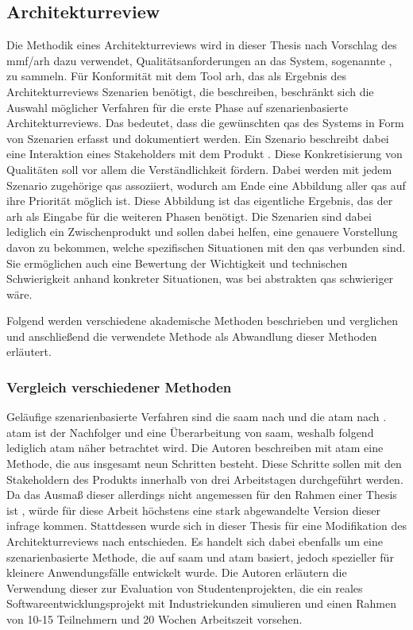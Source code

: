 \subsection{Architekturreview}
\label{sec:methodik-architekturreview}

Die Methodik eines Architekturreviews wird in dieser Thesis nach Vorschlag des \gls{mmf}/\gls{arh} dazu verwendet, Qualitätsanforderungen an das System, sogenannte , zu sammeln.
Für Konformität mit dem Tool \gls{arh}, das als Ergebnis des Architekturreviews Szenarien benötigt, die  beschreiben, beschränkt sich die Auswahl möglicher Verfahren für die erste Phase auf szenarienbasierte Architekturreviews.
Das bedeutet, dass die gewünschten \glspl{qa} des Systems in Form von Szenarien erfasst und dokumentiert werden.
Ein Szenario beschreibt dabei eine Interaktion eines Stakeholders mit dem Produkt \cite{kazman_2000}.
Diese Konkretisierung von Qualitäten soll vor allem die Verständlichkeit fördern.
Dabei werden mit jedem Szenario zugehörige \glspl{qa} assoziiert, wodurch am Ende eine Abbildung aller \glspl{qa} auf ihre Priorität möglich ist.
Diese Abbildung ist das eigentliche Ergebnis, das der \gls{arh} als Eingabe für die weiteren Phasen benötigt.
Die Szenarien sind dabei lediglich ein Zwischenprodukt und sollen dabei helfen, eine genauere Vorstellung davon zu bekommen, welche spezifischen Situationen mit den \glspl{qa} verbunden sind.
Sie ermöglichen auch eine Bewertung der Wichtigkeit und technischen Schwierigkeit anhand konkreter Situationen, was bei abstrakten \glspl{qa} schwieriger wäre.

Folgend werden verschiedene akademische Methoden beschrieben und verglichen und anschließend die verwendete Methode als Abwandlung dieser Methoden erläutert.

\subsubsection{Vergleich verschiedener Methoden}
\label{sec:atam-saam-svahnberg}

Geläufige szenarienbasierte Verfahren sind die \gls{saam} nach  und die \gls{atam} nach .
\gls{atam} ist der Nachfolger und eine Überarbeitung von \gls{saam}, weshalb folgend lediglich \gls{atam} näher betrachtet wird.
Die Autoren beschreiben mit \gls{atam} eine Methode, die aus insgesamt neun Schritten besteht.
Diese Schritte sollen mit den Stakeholdern des Produkts innerhalb von drei Arbeitstagen durchgeführt werden.
Da das Ausmaß dieser allerdings nicht angemessen für den Rahmen einer Thesis ist \cite{master-marvin-knodel}, würde für diese Arbeit höchstens eine stark abgewandelte Version dieser infrage kommen.
Stattdessen wurde sich in dieser Thesis für eine Modifikation des Architekturreviews nach  entschieden.
Es handelt sich dabei ebenfalls um eine szenarienbasierte Methode, die auf \gls{saam} und \gls{atam} basiert, jedoch spezieller für kleinere Anwendungsfälle entwickelt wurde.
Die Autoren erläutern die Verwendung dieser zur Evaluation von Studentenprojekten, die ein reales Softwareentwicklungsprojekt mit Industriekunden simulieren und einen Rahmen von 10-15 Teilnehmern und 20 Wochen Arbeitszeit vorsehen.

